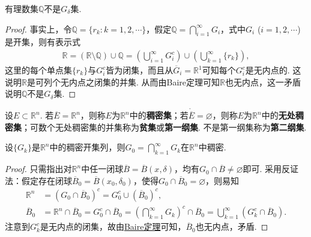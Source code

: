 \documentclass[../../main.tex]{subfiles}%
\begin{document}
\begin{example}\label{example:例13}
有理数集$\mathbb{Q}$不是$G_{\delta}$集.
\end{example}
\begin{proof}

事实上，令$\mathbb{Q}=\{r_k: k = 1,2,\cdots\}$，假定$\mathbb{Q}=\bigcap_{i = 1}^{\infty}G_i$，式中$G_i$ ($i = 1,2,\cdots$) 是开集，则有表示式
\begin{align*}
\mathbb{R}=(\mathbb{R}\setminus\mathbb{Q})\cup\mathbb{Q}=\left(\bigcup_{i = 1}^{\infty}G_i^c\right)\cup\left(\bigcup_{k = 1}^{\infty}\{r_k\}\right),
\end{align*}
这里的每个单点集$\{r_k\}$与$G_i^c$皆为闭集，而且从$\overline{G}_i=\mathbb{R}^1$可知每个$G_i^c$是无内点的. 这说明$\mathbb{R}$是可列个无内点之闭集的并集. 从而由Baire定理可知$\mathbb{R}$也无内点，这一矛盾说明$\mathbb{Q}$不是$G_{\delta}$集. 

\end{proof}

\begin{definition}
设$E\subset\mathbb{R}^n$. 若$\overline{E}=\mathbb{R}^n$，则称$E$为$\mathbb{R}^n$中的\textbf{稠密集}；若$\mathring{\overline{E}}=\varnothing$，则称$E$为$\mathbb{R}^n$中的\textbf{无处稠密集}；可数个无处稠密集的并集称为\textbf{贫集}或\textbf{第一纲集}. 不是第一纲集称为\textbf{第二纲集}.
\end{definition}

\begin{example}\label{example:例14}
设$\{G_k\}$是$\mathbb{R}^n$中的稠密开集列，则$G_0 = \bigcap_{k = 1}^{\infty}G_k$在$\mathbb{R}^n$中稠密.
\end{example}
\begin{proof}

只需指出对$\mathbb{R}^n$中任一闭球$\overline{B}=\overline{B}(x,\delta)$，均有$G_0\cap\overline{B}\neq\varnothing$即可. 采用反证法：假定存在闭球$\overline{B}_0=\overline{B}(x_0,\delta_0)$，使得$G_0\cap\overline{B}_0=\varnothing$，则易知
\begin{align*}
\mathbb{R}^n&=(G_0\cap\overline{B}_0)^c = G_0^c\cup(\overline{B}_0)^c,\\
\overline{B}_0&=\mathbb{R}^n\cap\overline{B}_0 = G_0^c\cap\overline{B}_0=\left(\bigcap_{k = 1}^{\infty}G_k\right)^c\cap\overline{B}_0=\bigcup_{k = 1}^{\infty}(G_k^c\cap\overline{B}_0).
\end{align*}
注意到$G_k^c$是无内点的闭集，故由\hyperref[theorem:Baire定理]{Baire定理}可知，$\overline{B}_0$也无内点，矛盾.

\end{proof}
\end{document}
